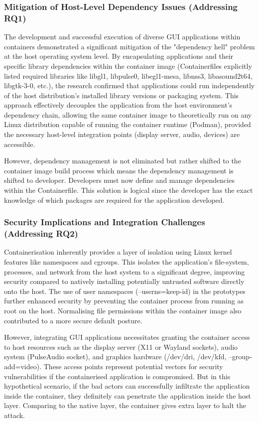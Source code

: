 \documentclass[journal,onecolumn]{IEEEtran}
\begin{document}
\subsubsection{Mitigation of Host-Level Dependency Issues (Addressing RQ1)}
The development and successful execution of diverse GUI applications within containers demonstrated a significant mitigation of the "dependency hell" problem at the host operating system level. By encapsulating applications and their specific library dependencies within the container image (Containerfiles explicitly listed required libraries like libgl1, libpulse0, libegl1-mesa, libnss3, libasound2t64, libgtk-3-0, etc.), the research confirmed that applications could run independently of the host distribution's installed library versions or packaging system. This approach effectively decouples the application from the host environment's dependency chain, allowing the same container image to theoretically run on any Linux distribution capable of running the container runtime (Podman), provided the necessary host-level integration points (display server, audio, devices) are accessible.

However, dependency management is not eliminated but rather shifted to the container image build process which means the dependency management is shifted to developer. Developers must now define and manage dependencies within the Containerfile. This solution is logical since the developer has the exact knowledge of which packages are required for the application developed.

\subsubsection{Security Implications and Integration Challenges (Addressing RQ2)}

Containerisation inherently provides a layer of isolation using Linux kernel features like namespaces and cgroups. This isolates the application's file-system, processes, and network from the host system to a significant degree, improving security compared to natively installing potentially untrusted software directly onto the host. The use of user namespaces (--userns=keep-id) in the prototypes further enhanced security by preventing the container process from running as root on the host. Normalising file permissions within the container image also contributed to a more secure default posture.

However, integrating GUI applications necessitates granting the container access to host resources such as the display server (X11 or Wayland sockets), audio system (PulseAudio socket), and graphics hardware (/dev/dri, /dev/kfd, --group-add=video). These access points represent potential vectors for security vulnerabilities if the containerised application is compromised. But in this hypothetical scenario, if the bad actors can successfully infiltrate the application inside the container, they definitely can penetrate the application inside the host layer. Comparing to the native layer, the container gives extra layer to halt the attack. 
\end{document}
